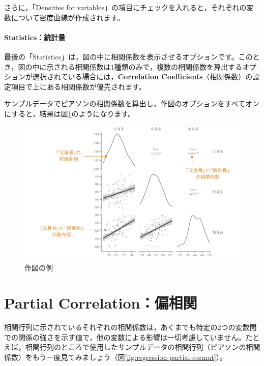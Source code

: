 \documentclass[
  12pt,
  a5jpaper,
  lualatex, ja=standard]{bxjsbook}
\begin{document}
さらに，「Densities for variables」の項目にチェックを入れると，それぞれの変数について密度曲線が作成されます。

\hypertarget{statisticsux7d71ux8a08ux91cf-1}{%
\paragraph*{Statistics：統計量}\label{statisticsux7d71ux8a08ux91cf-1}}

最後の「Statistics」は，図の中に相関係数を表示させるオプションです。このとき，図の中に示される相関係数は1種類のみで，複数の相関係数を算出するオプションが選択されている場合には，\textbf{Correlation Coefficients}（相関係数）の設定項目で上にある相関係数が優先されます。

サンプルデータでピアソンの相関係数を算出し，作図のオプションをすべてオンにすると，結果は図\ref{fig:regression-cor-plot-sample}のようになります。

\begin{figure}[!ht]

{\centering \includegraphics[width=1\linewidth]{images/regression/cor-plot-sample} 

}

\caption{作図の例}\label{fig:regression-cor-plot-sample}
\end{figure}

\hypertarget{sec:regression-partial}{%
\section{Partial Correlation：偏相関}\label{sec:regression-partial}}

相関行列に示されているそれぞれの相関係数は，あくまでも特定の2つの変数間での関係の強さを示す値で，他の変数による影響は一切考慮していません。たとえば，相関行列のところで使用したサンプルデータの相関行列（ピアソンの相関係数）をもう一度見てみましょう（図\ref{fig:regression-partial-cormat}）。
\end{document}
